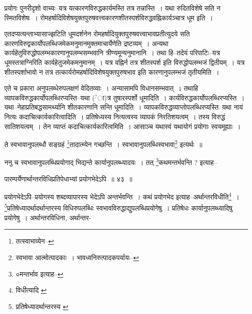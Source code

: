 \documentclass[article,12pt,a4paper]{memoir}
\newcommand{\unclear}[1]{($^{?}$#1)}
\begin{document}
	  \endgroup
	

	  \pstart प्रयोगः पुनरीदृशो वाच्यः--यत्र यत्कारणविरुद्धकार्यमस्ति तत्र तन्नास्ति । यथा रुदितविशेषे सति न स्मितविशेषः । रोमहर्षादिविशेषयुक्तपुरुषवत्त्वकारणशीतस्पर्शविरुद्धवह्निकार्यञ्चात्र धूम इति ।
	\pend
      

	  \pstart एतदप्यत्यन्ताभ्यासाज्झटिति धूमदर्शनेन रोमहर्षादियुक्तपुरुषवत्त्वाभावप्रतीत्युदये सति कारणविरुद्वकार्योपलब्धिजमेकमनुमानमुक्तमाचार्येणेति द्रष्टव्यम् । अन्यथा कार्यहेतुविरुद्धोपलम्भकारणानुपलम्भसम्भवानि त्रीण्यमून्यनुमानानि । तथा हि--तदेयं परिपाटिः--यत्र धूमस्तत्राग्निरिति कार्यहेतुजमेकमनुमानम् । यत्र वह्निर्न तत्र शीतस्पर्श इति विरुद्धोपलम्भजं द्वितीयम् । यत्र शीतस्पर्शाभावो न तत्र तत्कार्यरोमहर्षादिविशेषयुक्तपुरुषभाव इति कारणानुपलम्भजं तृतीयमिति ।
	\pend
      

	  \pstart एते च प्रकारा अनुपलब्धेरुपलक्षणं वेदितव्याः । अन्यासामपि विधानसम्भवात् । तथाहि व्यापकविरुद्धकार्योपलब्धिरप्यस्ति--यथा \unclear{ा}त्र तुषारस्पर्शो धूमादिति । कार्यविरुद्धकार्योपलब्धिरप्यस्ति । यथा--नेहाप्रतिबद्धसामर्थ्यानि शीतकारणानि सन्ति धूमादिति । व्यापकविरुद्धव्याप्तोपलब्धिरप्यस्ति--यथा नायं नित्यः कदाचित्कार्यकारित्वादिति । प्रतिषेध्यस्य नित्यत्वस्य व्यापकं निरतिशयत्वम् । तस्य विरुद्धं सातिशयत्वम् । तेन व्याप्तं कदाचित्कार्यकारित्वमिति । आसाञ्च यथास्वं यथायोगं प्रयोगाः स्वयमूह्याः ।
	\pend
      \leavevmode{}
	  \bigskip
	  \begingroup
	

	  \pstart ते स्वभावानुपलब्धौ सङ्ग्रहं \footnote{तत्स्वाभाव्येन--\cite{dp-msD-n}}तादात्म्येन गच्छन्ति । स्वभावानुपलब्धिस्वभावा\footnote{स्वभावा आत्मोत्पादकाः । भावध्वनिरुत्पादकपर्यायः--\cite{dp-msD-n}} इत्यर्थः ॥
	\pend
       

	  \pstart ननु च स्वभावानुपलब्धिप्रयोगाद् भिद्यन्ते कार्यानुपलब्ध्यादयः । तत् \footnote{०मन्तर्भाव इत्याह--\cite{dp-msC}}कथमन्तर्भवन्ति ? इत्याह--
	\pend
       
	  \bigskip
	  \begingroup
	

	  \pstart पारम्पर्येणार्थान्तरविधिप्रतिपेधाभ्यां प्रयोगभेदेऽपि ॥ ४३ ॥
	\pend
      
	  \endgroup
	 

	  \pstart प्रयोगभेदेऽपि--प्रयोगस्य शब्दव्यापारस्य भेदेऽपि अन्तर्भवन्ति । कथं प्रयोगभेद इत्याह--अर्थान्तरविधीति\footnote{विधीत्यादि \cite{dp-edP} \cite{dp-edH} \cite{dp-edE} \cite{dp-edN}} । \footnote{प्रतिषेध्यादर्थान्तरस्य \cite{dp-msB}}प्रतिषेध्यादर्थादर्थान्तरस्य विधिरुपलब्धिः स्वभावविरुद्धाद्युपलब्धिप्रयोगेषु । प्रतिषेधः कार्यानुपलब्ध्यादिषु प्रयोगेषु । अर्थान्तरविधिना, अर्थान्तर-
	\pend
      
\end{document}
